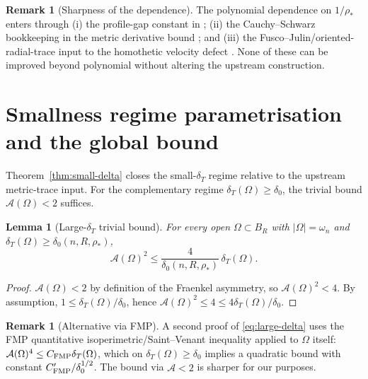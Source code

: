 \documentclass[11pt]{article}
\newtheorem{lemma}[theorem]{Lemma}
\theoremstyle{definition}
\newtheorem{remark}[theorem]{Remark}
\newcommand{\Fr}{\mathcal{A}}
\newcommand{\Om}{\Omega}
\newcommand{\rstar}{\rho_{*}}
\begin{document}
\begin{remark}[Sharpness of the dependence]
The polynomial dependence on $1/\rstar$ enters through (i) the
profile-gap constant in \cite[(5.1)]{LevelSetIdentity}; (ii) the
Cauchy--Schwarz bookkeeping in the metric derivative bound
\cite[(2.4),(4.2)]{WeightedMetricTrace}; and (iii) the
Fusco--Julin/oriented-radial-trace input to the homothetic velocity defect
\cite{WeightedMetricTrace}. None of these can be improved beyond
polynomial without altering the upstream construction.
\end{remark}

\section{Smallness regime parametrisation and the global bound}
\label{sec:smallness}

Theorem~\ref{thm:small-delta} closes the small-$\delta_T$ regime
relative to the upstream metric-trace input.
For the complementary regime $\delta_T(\Om)\ge\delta_0$, the trivial
bound $\Fr(\Om)<2$ suffices.

\begin{lemma}[Large-$\delta_T$ trivial bound]\label{lem:large-delta}
For every open $\Om\subset B_R$ with $|\Om|=\omega_n$ and
$\delta_T(\Om)\ge \delta_0(n,R,\rstar)$,
\begin{equation}\label{eq:large-delta}
\Fr(\Om)^2\le \frac{4}{\delta_0(n,R,\rstar)}\,\delta_T(\Om).
\end{equation}
\end{lemma}

\begin{proof}
$\Fr(\Om)<2$ by definition of the Fraenkel asymmetry, so
$\Fr(\Om)^2<4$. By assumption,
$1\le \delta_T(\Om)/\delta_0$, hence
$\Fr(\Om)^2\le 4\le 4\delta_T(\Om)/\delta_0$.
\end{proof}

\begin{remark}[Alternative via FMP]\label{rem:FMP}
A second proof of \eqref{eq:large-delta} uses the FMP quantitative
isoperimetric/Saint--Venant inequality \cite{FMP2008,Maggi2012} applied
to $\Om$ itself: $\Fr(\Om)^4\le C_{\rm FMP}\delta_T(\Om)$, which on
$\delta_T(\Om)\ge\delta_0$ implies a quadratic bound with constant
$C'_{\rm FMP}/\delta_0^{1/2}$. The bound via $\Fr<2$ is sharper for
our purposes.
\end{remark}
\end{document}
